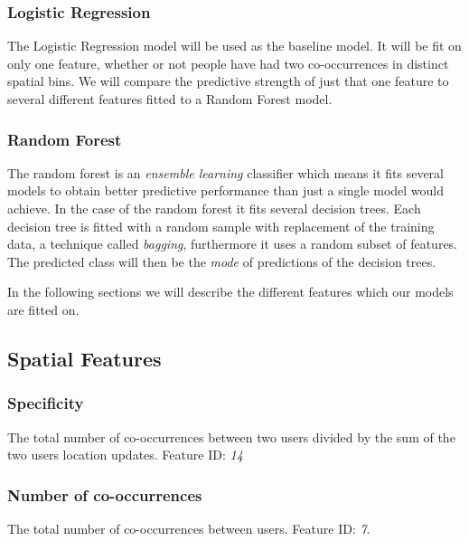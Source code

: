 \subsubsection{Logistic Regression}
The Logistic Regression model will be used as the baseline model. It will be fit on only one feature, whether or not people have had two co-occurrences in distinct spatial bins. We will compare the predictive strength of just that one feature to several different features fitted to a Random Forest model.

\subsubsection{Random Forest}
The random forest is an \textit{ensemble learning} classifier which means it fits several models to obtain better predictive performance than just a single model would achieve. In the case of the random forest it fits several decision trees. Each decision tree is fitted with a random sample with replacement of the training data, a technique called \textit{bagging}, furthermore it uses a random subset of features. The predicted class will then be the \textit{mode} of predictions of the decision trees.

In the following sections we will describe the different features which our models are fitted on.

\subsection{Spatial Features}

\subsubsection{Specificity}
The total number of co-occurrences between two users divided by the sum of the two users location updates. Feature ID: \textit{14}

\subsubsection{Number of co-occurrences}
The total number of co-occurrences between users. Feature ID: \textit{7}.

